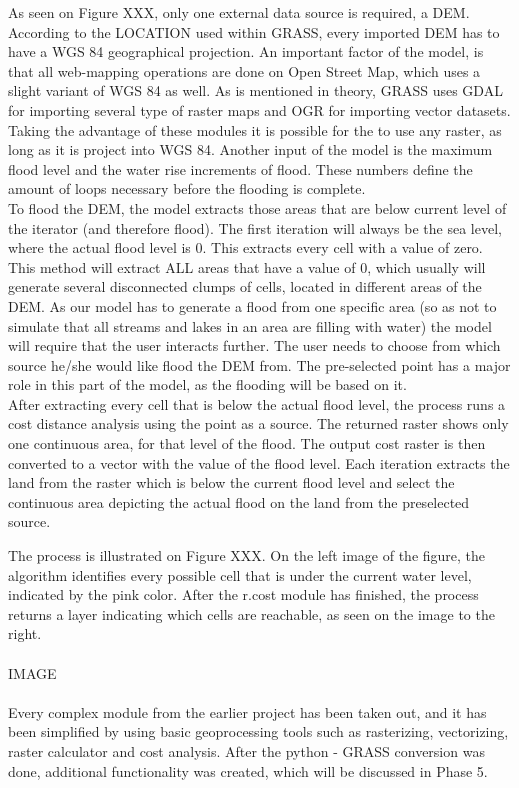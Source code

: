 As seen on Figure XXX, only one external data source is required, a DEM. According to the LOCATION used within GRASS, every imported DEM has to have a WGS 84 geographical projection. An important factor of the model, is that all web-mapping operations are done on Open Street Map, which uses a slight variant of WGS 84 as well. As is mentioned in theory, GRASS uses GDAL for importing several type of raster maps and OGR for importing vector datasets. Taking the advantage of these modules it is possible for the to use any raster, as long as it is project into WGS 84. Another input of the model is the maximum flood level and the water rise increments of flood. These numbers define the amount of loops necessary before the flooding is complete.\\
To flood the DEM, the model extracts those areas that are below current level of the iterator (and therefore flood). The first iteration will always be the sea level, where the actual flood level is 0. This extracts every cell with a value of zero. \\
This method will extract ALL areas that have a value of 0, which usually will generate several disconnected clumps of cells, located in different areas of the DEM. As our model has to generate a flood from one specific area (so as not to simulate that all streams and lakes in an area are filling with water) the model will require that the user interacts further. The user needs to choose from which source he/she would like flood the DEM from. The pre-selected point has a major role in this part of the model, as the flooding will be based on it. \\

After extracting every cell that is below the actual flood level, the process runs a cost distance analysis using the point as a source. The returned raster shows only one continuous area, for that level of the flood. The output cost raster is then converted to a vector with the value of the flood level. Each iteration extracts the land from the raster which is below the current flood level and select the continuous area depicting the actual flood on the land from the preselected source. 

The process is illustrated on Figure XXX. On the left image of the figure, the algorithm identifies every possible cell that is under the current water level, indicated by the pink color. After the r.cost module has finished, the process returns a layer indicating which cells are reachable, as seen on the image to the right.\\
\\
IMAGE\\
\\
Every complex module from the earlier project has been taken out, and it has been simplified by using basic geoprocessing tools such as rasterizing, vectorizing, raster calculator and cost analysis. After the python - GRASS conversion was done, additional functionality was created, which will be discussed in Phase 5.

